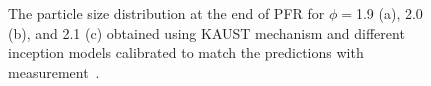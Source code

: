\begin{figure}[H]
	\centering
	\caption{The particle size distribution at the end of PFR for $\phi=$1.9 (a), 2.0 (b), and 2.1 (c) obtained using KAUST mechanism and different inception models calibrated to match the predictions with measurement~\citep{manzello2007soot}.}
	\label{fig:psrpfr_psd} 
\end{figure}


